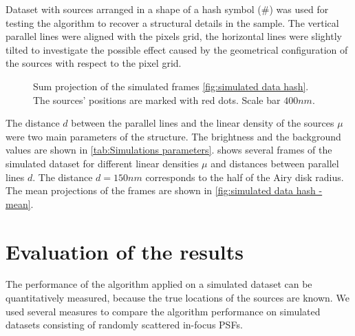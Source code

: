 Dataset with sources arranged in a shape of a hash symbol (\#) was used for testing the algorithm to recover a structural details in the sample. The vertical parallel lines were aligned with the pixels grid, the horizontal lines were slightly tilted to investigate the possible effect caused by the geometrical configuration of the sources with respect to the pixel grid. 
%
\begin{figure}[!htb]	
	\newcommand{\widthfig}{.3\textwidth}	
	\centering	
	\hspace{.3cm}		
	\hspace{.3cm}	
	\caption{Sum projection of the simulated frames \autoref{fig:simulated data hash}. The sources' positions are marked with red dots. Scale bar $400 \unit{nm}$.}
	\label{fig:simulated data hash - mean}
\end{figure} 
%
The distance $d$ between the parallel lines and the linear density of the sources $\mu$ were two main parameters of the structure. The brightness and the background values are shown in \autoref{tab:Simulations parameters}.  shows several frames of the simulated dataset for different linear densities $\mu$ and distances between parallel lines $d$. The distance $d=150\unit{nm}$ corresponds to the half of the Airy disk radius. The mean projections of the frames are shown in \autoref{fig:simulated data hash - mean}.  


\clearpage
\section{Evaluation of the results\label{sec:evaluation}}

The performance of the algorithm applied on a simulated dataset can be quantitatively measured, because the true locations of the sources are known. We used several measures to compare the algorithm performance on simulated datasets consisting of randomly scattered in-focus PSFs. 

